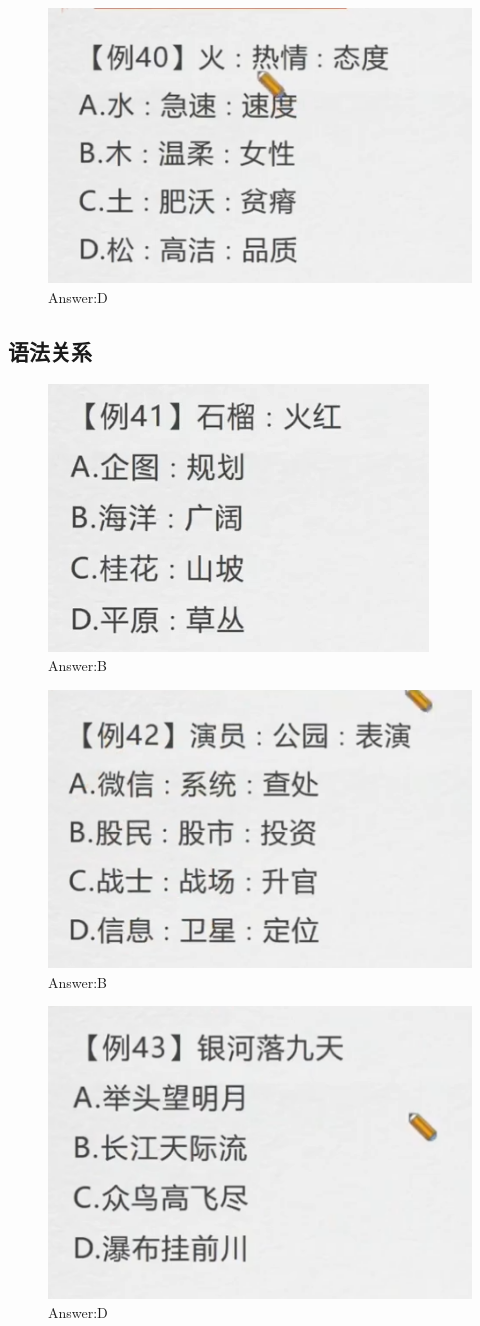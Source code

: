 \documentclass{article}
\numberwithin{equation}{section}						%
\numberwithin{figure}{section}							%
\begin{document}
\begin{sloppypar}
\begin{figure}[H]
     \centering
     \includegraphics[width=0.4\linewidth]{140.png}
		\caption{Answer:D}
\end{figure}

\subsection{语法关系}

\begin{figure}[H]
     \centering
     \includegraphics[width=0.4\linewidth]{141.png}
		\caption{Answer:B}
\end{figure}


\begin{figure}[H]
     \centering
     \includegraphics[width=0.4\linewidth]{142.png}
		\caption{Answer:B}
\end{figure}

\begin{figure}[H]
     \centering
     \includegraphics[width=0.4\linewidth]{143.png}
		\caption{Answer:D}
\end{figure}


\end{sloppypar}
\end{document}
